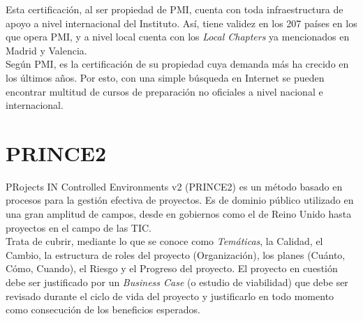 Esta certificación, al ser propiedad de PMI, cuenta con toda infraestructura de apoyo a nivel internacional del Instituto. Así, tiene validez en los 207 países en los que opera PMI, y a nivel local cuenta con los \emph{Local Chapters} ya mencionados en Madrid y Valencia.\\

Según PMI, es la certificación de su propiedad cuya demanda más ha crecido en los últimos años. Por esto, con una simple búsqueda en Internet se pueden encontrar multitud de cursos de preparación no oficiales a nivel nacional e internacional.


\section{PRINCE2}

PRojects IN Controlled Environments v2 (PRINCE2) es un método basado en procesos para la gestión efectiva de proyectos. Es de dominio público utilizado en una gran amplitud de campos, desde en gobiernos como el de Reino Unido hasta proyectos en el campo de las TIC.\\

Trata de cubrir, mediante lo que se conoce como \emph{Temáticas}, la Calidad, el Cambio, la estructura de roles del proyecto (Organización), los planes (Cuánto, Cómo, Cuando), el Riesgo y el Progreso del proyecto. El proyecto en cuestión debe ser justificado por un \emph{Business Case} (o estudio de viabilidad) que debe ser revisado durante el ciclo de vida del proyecto y justificarlo en todo momento como consecución de los beneficios esperados.\\

